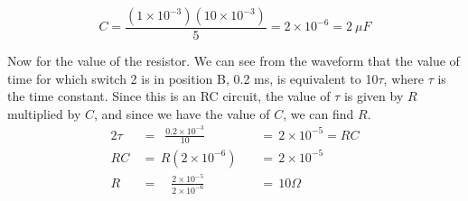 \documentclass[12pt]{article}
\begin{document}
    \[
        C = \frac{(1 \times 10^{-3})(10 \times 10^{-3})}{5} = 2 \times 10^{-6} = \boxed{2\ \mu F}
    \]
    \par Now for the value of the resistor. We can see from the waveform that
    the value of time for which switch 2 is in position B, 0.2 ms, is equivalent
    to 10$\tau$, where $\tau$ is the time constant. Since this is an RC circuit,
    the value of $\tau$ is given by $R$ multiplied by $C$, and since we have the
    value of $C$, we can find $R$.
    \begin{alignat*}{2}
        \tau &\,=\, \, \, \frac{0.2 \times 10^{-3}}{10} &&\,=\, 2 \times 10^{-5} = RC \\
        RC &\,=\, R(2\times 10^{-6}) &&\,=\, 2 \times 10^{-5} \\
        R &\,=\quad \frac{2 \times 10^{-5}}{2 \times 10 ^{-6}} &&\,=\, \boxed{10 \Omega}
    \end{alignat*}
    \newpage
\end{document}
